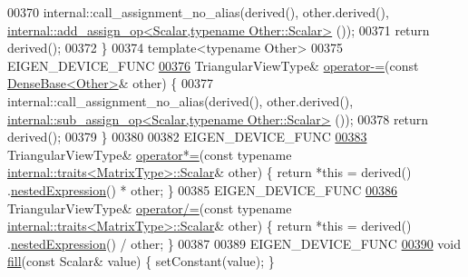 \begin{DoxyCode}
00370       internal::call\_assignment\_no\_alias(derived(), other.derived(), 
      \hyperlink{struct_eigen_1_1internal_1_1add__assign__op}{internal::add\_assign\_op<Scalar,typename Other::Scalar>}
      ());
00371       \textcolor{keywordflow}{return} derived();
00372     \}
00374     \textcolor{keyword}{template}<\textcolor{keyword}{typename} Other>
00375     EIGEN\_DEVICE\_FUNC
\hyperlink{group___core___module_a9cc4a65490e86eb0cc0d7f764782eeb6}{00376}     TriangularViewType&  \hyperlink{group___core___module_a9cc4a65490e86eb0cc0d7f764782eeb6}{operator-=}(\textcolor{keyword}{const} \hyperlink{group___core___module_class_eigen_1_1_dense_base}{DenseBase<Other>}& other) \{
00377       internal::call\_assignment\_no\_alias(derived(), other.derived(), 
      \hyperlink{struct_eigen_1_1internal_1_1sub__assign__op}{internal::sub\_assign\_op<Scalar,typename Other::Scalar>}
      ());
00378       \textcolor{keywordflow}{return} derived();
00379     \}
00380     
00382     EIGEN\_DEVICE\_FUNC
\hyperlink{group___core___module_a70ea969ab731d87a0e73e2884ab8fbc4}{00383}     TriangularViewType&  \hyperlink{group___core___module_a70ea969ab731d87a0e73e2884ab8fbc4}{operator*=}(\textcolor{keyword}{const} \textcolor{keyword}{typename} 
      \hyperlink{struct_eigen_1_1internal_1_1traits}{internal::traits<MatrixType>::Scalar}& other) \{ \textcolor{keywordflow}{return} *\textcolor{keyword}{this} = derived()
      .\hyperlink{group___core___module_a83b7cdd9d9ea543a3c893fc2e74d8fbb}{nestedExpression}() * other; \}
00385     EIGEN\_DEVICE\_FUNC
\hyperlink{group___core___module_a3bcca994aae11aeef15acb734f9a1a3f}{00386}     TriangularViewType&  \hyperlink{group___core___module_a3bcca994aae11aeef15acb734f9a1a3f}{operator/=}(\textcolor{keyword}{const} \textcolor{keyword}{typename} 
      \hyperlink{struct_eigen_1_1internal_1_1traits}{internal::traits<MatrixType>::Scalar}& other) \{ \textcolor{keywordflow}{return} *\textcolor{keyword}{this} = derived()
      .\hyperlink{group___core___module_a83b7cdd9d9ea543a3c893fc2e74d8fbb}{nestedExpression}() / other; \}
00387 
00389     EIGEN\_DEVICE\_FUNC
\hyperlink{group___core___module_ad4093c8ecb74b7eb0567d1161bcc9964}{00390}     \textcolor{keywordtype}{void} \hyperlink{group___core___module_ad4093c8ecb74b7eb0567d1161bcc9964}{fill}(\textcolor{keyword}{const} Scalar& value) \{ setConstant(value); \}

\end{DoxyCode}
